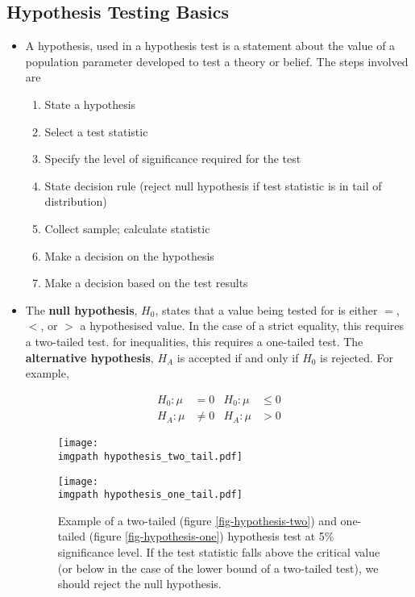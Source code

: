 \documentclass[../notes_compiled.tex]{subfiles}
\begin{document}
\subsection{Hypothesis Testing Basics}
\begin{itemize}
\item A hypothesis, used in a hypothesis test is a statement about the value of a population parameter developed to test a theory or belief. The steps involved are
\begin{enumerate}
\item State a hypothesis
\item Select a test statistic
\item Specify the level of significance required for the test
\item State decision rule (reject null hypothesis if test statistic is in tail of distribution)
\item Collect sample; calculate statistic
\item Make a decision on the hypothesis
\item Make a decision based on the test results
\end{enumerate}

\item The \textbf{null hypothesis}, $H_{0}$, states that a value being tested for is either $=$, $<$, or $>$ a hypothesised value. In the case of a strict equality, this requires a two-tailed test. for inequalities, this requires a one-tailed test. The \textbf{alternative hypothesis}, $H_{A}$ is accepted if and only if $H_{0}$ is rejected. For example, 

\begin{align*}
H_{0}: \mu & =0 & H_{0}: \mu & \leq0\\
H_{A}: \mu & \neq 0 & H_{A}: \mu & >0 
\end{align*}

\begin{figure}[h]
  \centering
  \hfill \hfill
  \begin{minipage}{0.4\textwidth}
    \centering
    \texttt{[image: \\imgpath hypothesis\_two\_tail.pdf]}  %
    \label{fig-hypothesis-two}
  \end{minipage} \hfill
  \begin{minipage}{0.4\textwidth}
    \centering
    \texttt{[image: \\imgpath hypothesis\_one\_tail.pdf]}  %
    \label{fig-hypothesis-one}
  \end{minipage}
  \hfill \hfill
  \caption{Example of a two-tailed (figure \ref{fig-hypothesis-two}) and one-tailed (figure \ref{fig-hypothesis-one}) hypothesis test at 5\% significance level. If the test statistic falls above the critical value (or below in the case of the lower bound of a two-tailed test), we should reject the null hypothesis.}
  \label{fig-hypothesis-test}
\end{figure}


\end{itemize}
\end{document}
